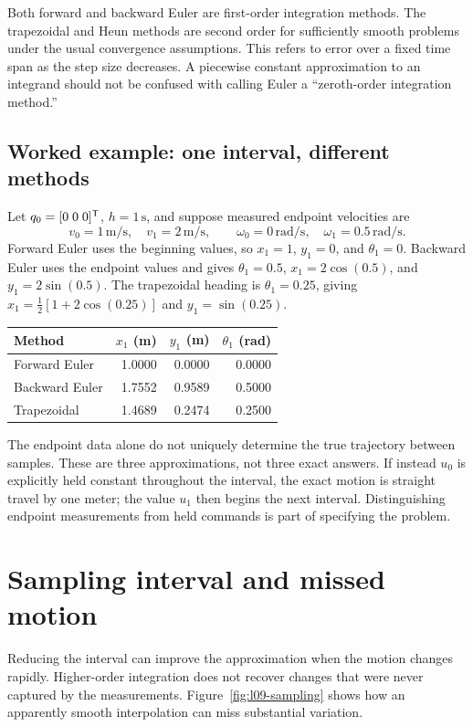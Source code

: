 Both forward and backward Euler are first-order integration methods. The
trapezoidal and Heun methods are second order for sufficiently smooth
problems under the usual convergence assumptions. This refers to error
over a fixed time span as the step size decreases. A piecewise constant
approximation to an integrand should not be confused with calling Euler
a ``zeroth-order integration method.''

\subsection{Worked example: one interval, different methods}
Let $q_0=[0\;0\;0]^{\mathsf T}$, $h=1\,\mathrm s$, and suppose measured
endpoint velocities are
\[
 v_0=1\,\mathrm{m/s},\quad v_1=2\,\mathrm{m/s},\qquad
 \omega_0=0\,\mathrm{rad/s},\quad\omega_1=0.5\,\mathrm{rad/s}.
\]
Forward Euler uses the beginning values, so
$x_1=1$, $y_1=0$, and $\theta_1=0$. Backward Euler uses the endpoint
values and gives $\theta_1=0.5$, $x_1=2\cos(0.5)$, and
$y_1=2\sin(0.5)$. The trapezoidal heading is $\theta_1=0.25$, giving
$x_1=\tfrac12[1+2\cos(0.25)]$ and $y_1=\sin(0.25)$.

\begin{center}
\begin{tabular}{lrrr}
\toprule
Method & $x_1$ (m) & $y_1$ (m) & $\theta_1$ (rad)\\
\midrule
Forward Euler & 1.0000 & 0.0000 & 0.0000\\
Backward Euler & 1.7552 & 0.9589 & 0.5000\\
Trapezoidal & 1.4689 & 0.2474 & 0.2500\\
\bottomrule
\end{tabular}
\end{center}

The endpoint data alone do not uniquely determine the true trajectory
between samples. These are three approximations, not three exact answers.
If instead $u_0$ is explicitly held constant throughout the interval, the
exact motion is straight travel by one meter; the value $u_1$ then begins
the next interval. Distinguishing endpoint measurements from held commands
is part of specifying the problem.

\section{Sampling interval and missed motion}
Reducing the interval can improve the approximation when the motion changes
rapidly. Higher-order integration does not recover changes that were never
captured by the measurements. Figure~\ref{fig:l09-sampling} shows how an
apparently smooth interpolation can miss substantial variation.

